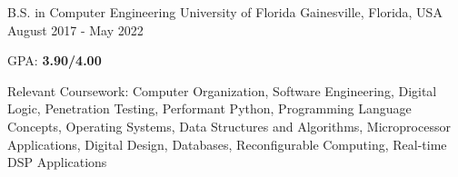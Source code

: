 

\begin{cventries}

  \cventry
    {B.S. in Computer Engineering} %
    {University of Florida} %
    {Gainesville, Florida, USA} %
    {August 2017 - May 2022} %
    {
      \begin{cvitems} %
        \item {GPA: \textbf{3.90/4.00}}
        \item {Relevant Coursework: Computer Organization, Software Engineering, Digital Logic, Penetration Testing, Performant Python, Programming Language Concepts, Operating Systems, Data Structures and Algorithms, Microprocessor Applications, Digital Design, Databases, Reconfigurable Computing, Real-time DSP Applications}
      \end{cvitems}
    }

\end{cventries}
